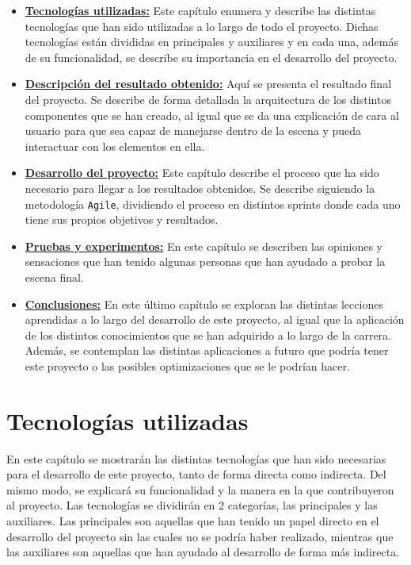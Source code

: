 \documentclass[a4paper, 12pt]{book}
\begin{document}
\begin{itemize}
  \item \hyperref[chap:tecnologias]{\textbf{Tecnologías utilizadas:}} Este capítulo enumera y describe las distintas tecnologías que han sido utilizadas a lo largo de todo el proyecto. Dichas tecnologías están divididas en principales y auxiliares y en cada una, además de su funcionalidad, se describe su importancia en el desarrollo del proyecto.
  \item \hyperref[chap:resultados]{\textbf{Descripción del resultado obtenido:}} Aquí se presenta el resultado final del proyecto. Se describe de forma detallada la arquitectura de los distintos componentes que se han creado, al igual que se da una explicación de cara al usuario para que sea capaz de manejarse dentro de la escena y pueda interactuar con los elementos en ella. 
  \item \hyperref[chap:Desarrollo del proyecto]{\textbf{Desarrollo del proyecto:}} Este capítulo describe el proceso que ha sido necesario para llegar a los resultados obtenidos. Se describe siguiendo la metodología \texttt{Agile}, dividiendo el proceso en distintos sprints donde cada uno tiene sus propios objetivos y resultados.
  \item \hyperref[chap:pruebas-experimentos]{\textbf{Pruebas y experimentos:}} En este capítulo se describen las opiniones y sensaciones que han tenido algunas personas que han ayudado a probar la escena final. 
  \item \hyperref[chap:conclusiones]{\textbf{Conclusiones:}} En este último capítulo se exploran las distintas lecciones aprendidas a lo largo del desarrollo de este proyecto, al igual que la aplicación de los distintos conocimientos que se han adquirido a lo largo de la carrera. Además, se contemplan las distintas aplicaciones a futuro que podría tener este proyecto o las posibles optimizaciones que se le podrían hacer.
\end{itemize}



\cleardoublepage %
\chapter{Tecnologías utilizadas} 
\label{chap:tecnologias} %
En este capítulo se mostrarán las distintas tecnologías que han sido necesarias para el desarrollo de este proyecto, tanto de forma directa como indirecta. Del mismo modo, se explicará su funcionalidad
y la manera en la que contribuyeron al proyecto. Las tecnologías se dividirán en 2 categorías, las principales y las auxiliares. Las principales son aquellas que han tenido un papel directo en el desarrollo 
del proyecto sin las cuales no se podría haber realizado, mientras que las auxiliares son aquellas que han ayudado al desarrollo de forma más indirecta.  
\end{document}
